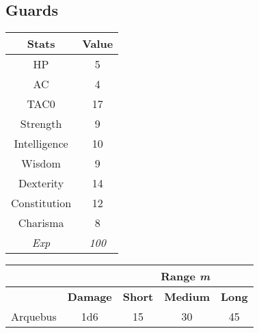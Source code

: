 \subsection{Guards}
\begin{table}[H]
  \centering
\begin{tabular}{|c|c|}
\hline
\rowcolor[HTML]{C0C0C0}
\textbf{Stats} & \textbf{Value } \\ \hline
HP & 5 \\ \hline
AC & 4 \\ \hline
TAC0 & 17 \\ \hline
Strength & 9  \\ \hline
Intelligence & 10 \\ \hline
Wisdom & 9 \\ \hline
Dexterity & 14 \\ \hline
Constitution & 12 \\ \hline
Charisma & 8 \\ \hline
\textit{Exp} & \textit{100} \\ \hline
\end{tabular}
\end{table}
\begin{table}[H]
  \centering
  \begin{tabular}{ll|c|c|c|}
    \cline{3-5}
     &  & \multicolumn{3}{c|}{\cellcolor[HTML]{C0C0C0}\textbf{Range \textit{m}}} \\ \hline
    \rowcolor[HTML]{C0C0C0}
    \multicolumn{1}{|l|}{\cellcolor[HTML]{C0C0C0}\textbf{Weapon}} & \textbf{Damage} & \multicolumn{1}{l|}{\cellcolor[HTML]{C0C0C0}\textbf{Short}} & \textbf{Medium} & \textbf{Long} \\ \hline
    \multicolumn{1}{|c|}{Arquebus} & \multicolumn{1}{c|}{1d6} & 15 & 30 & 45 \\ \hline
  \end{tabular}
\end{table}

